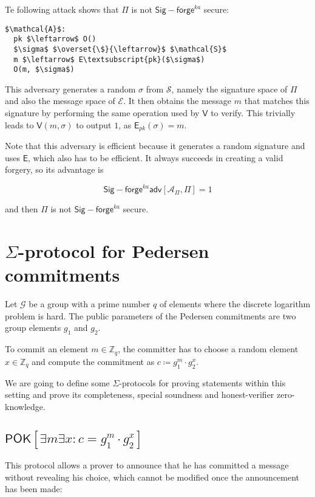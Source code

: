 \documentclass{article}
\begin{document}
Te following attack shows that $\Pi$ is not 
$\mathsf{Sig-forge}^{ka}$ secure:

\begin{Verbatim}[commandchars=\\\{\},codes={\catcode`$=3\catcode`_=8}]
$\mathcal{A}$:
  pk $\leftarrow$ O()
  $\sigma$ $\overset{\$}{\leftarrow}$ $\mathcal{S}$
  m $\leftarrow$ E\textsubscript{pk}($\sigma$)
  O(m, $\sigma$)
\end{Verbatim}

This adversary generates a random $\sigma$ from 
$\mathcal{S}$, namely the signature space of $\Pi$ 
and also the message space of $\mathcal{E}$. It then obtains
the message $m$ that matches this signature by performing
the same operation used by $\mathsf{V}$ to verify. This trivially
leads to $\mathsf{V}(m, \sigma)$ to output $1$, as 
$\mathsf{E}_{pk}(\sigma) = m$.

Note that this adversary is efficient because it generates 
a random signature and uses $\mathsf{E}$, which also has to be 
efficient. It always succeeds in creating a valid forgery, so its 
advantage is

$$
\mathsf{Sig-forge}^{ka}\mathsf{adv}[\mathcal{A}_{\Pi}, \Pi] = 1
$$

and then $\Pi$ is not $\mathsf{Sig-forge}^{ka}$ secure.

\section{$\Sigma$-protocol for Pedersen commitments}

Let $\mathcal{G}$ be a group with a prime number $q$ of elements
where the discrete logarithm problem is hard. The public parameters 
of the Pedersen commitments are two group elements $g_1$ and $g_2$.

To commit an element $m \in \mathbb{Z}_q$, the committer has to 
choose a random element $x \in \mathbb{Z}_q$ and compute the 
commitment as $c \coloneqq g_1^m \cdot g_2^x$.

We are going to define some $\Sigma$-protocols for proving 
statements within this setting and prove its completeness, 
special soundness and honest-verifier zero-knowledge.

\subsection{$\mathsf{POK}[\exists m \exists x : c = g_1^m \cdot g_2^x]$}

This protocol allows a prover to announce that he has committed
a message without revealing his choice, which cannot be modified
once the announcement has been made:
\end{document}
